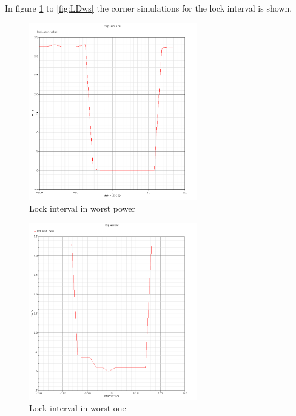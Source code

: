 \documentclass[a4paper,12pt]{article} \usepackage{graphicx}
\begin{document}
In figure \ref{fig:LDwp} to \ref{fig:LDws} the corner simulations for
the lock interval is shown.

\begin{figure}[h]
  \centering
  \includegraphics[width=0.65\textwidth]{../Bilder/LD_tran/LD_lsim_wp.png}
  \caption{Lock interval in worst power}
  \label{fig:LDwp}
\end{figure}

\begin{figure}[h]
  \centering
  \includegraphics[width=0.65\textwidth]{../Bilder/LD_tran/LD_lsim_wo.png}
  \caption{Lock interval in worst one}
  \label{fig:LDwo}
\end{figure}
\end{document}
